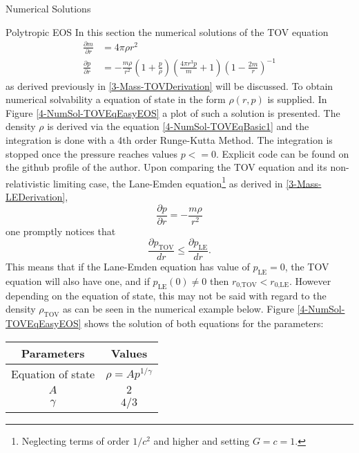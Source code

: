 \begin{section}{Numerical Solutions}
\begin{subsection}{Polytropic EOS}
In this section the numerical solutions of the TOV equation
\begin{align}
	\frac{\partial m}{\partial r} &= 4\pi\rho r^2\label{4-NumSol-TOVEqBasic1}\\
	\frac{\partial p}{\partial r} &=-\frac{m\rho}{r^2}\left(1+\frac{p}{\rho}\right)\left(\frac{4\pi r^3p}{m}+1\right)\left(1-\frac{2m}{r}\right)^{-1}
	\label{4-NumSol-TOVEqBasic2}
\end{align}
as derived previously in \ref{3-Mass-TOVDerivation} will be discussed. To obtain numerical solvability a equation of state in the form $\rho(r,p)$ is supplied. 
In Figure \ref{4-NumSol-TOVEqEasyEOS} a plot of such a solution is presented.
The density $\rho$ is derived via the equation \ref{4-NumSol-TOVEqBasic1} and the integration is done with a 4th order Runge-Kutta Method. The integration is stopped once the pressure reaches values $p<=0$.  Explicit code can be found on the github profile of the author\cite{pleyerGithubRepositoryJonas}. Upon comparing the TOV equation and its non-relativistic limiting case, the Lane-Emden equation\footnote{Neglecting terms of order $1/c^2$ and higher and setting $G=c=1$.} as derived in \ref{3-Mass-LEDerivation},
\begin{equation}
	\frac{\partial p}{\partial r} = -\frac{m\rho}{r^2}
\end{equation}
one promptly notices that
\begin{equation}
	\frac{\partial p_{\text{TOV}}}{dr} \leq \frac{\partial p_{\text{LE}}}{dr}.
\end{equation}
This means that if the Lane-Emden equation has value of $p_\text{LE}=0$, the TOV equation will also have one, and if $p_\text{LE}(0)\neq0$ then $r_\text{0,TOV}<r_\text{0,LE}$. However depending on the equation of state, this may not be said with regard to the density $\rho_\text{TOV}$ as can be seen in the numerical example below. Figure \ref{4-NumSol-TOVEqEasyEOS} shows the solution of both equations for the parameters:
\begin{table}[h]
	\centering
	\begin{tabular}{|c|c|}
		\hline
		Parameters & Values \\
		\hline
		Equation of state & $\rho=Ap^{1/\gamma}$ \\
		$A$ & $2$\\
		$\gamma$ & $4/3$ \\

\end{tabular}
\end{table}
\end{subsection}
\end{section}
